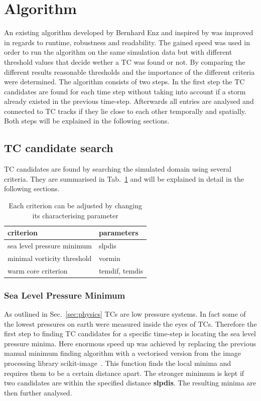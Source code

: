 \section{Algorithm}
An existing algorithm developed by Bernhard Enz and inspired by \cite{orig-tracking} was improved in regards to runtime, robustness and
readability. The gained speed was used in order to run the algorithm on the
same simulation data but with different threshold values that decide wether a
TC was found or not. By comparing the different results reasonable thresholds
and the importance of the different criteria were determined.\newline
The algorithm consists of two steps. In the first step the TC candidates are
found for each time step without taking into account if a storm already existed
in the previous time-step. Afterwards all entries are analysed and connected to
TC tracks if they lie close to each other temporally and spatially. Both steps
will be explained in the following sections.
\subsection{TC candidate search}
TC candidates are found by searching the simulated domain using several
criteria. They are summarised in Tab.~\ref{tab:search-algo-summ} and will be
explained in detail in the following sections.
\begin{table}[h]
	\centering
	\begin{tabular}{|l|l|}
		\hline
		\textbf{criterion}          & \textbf{parameters} \\ \hline
		sea level pressure minimum  & slpdis              \\
		minimal vorticity threshold & vormin              \\
		warm core criterion         & temdif, temdis      \\ \hline
	\end{tabular}
	\caption{Each criterion can be adjusted by changing its characterising
		parameter}
	\label{tab:search-algo-summ}
\end{table}

\subsubsection*{Sea Level Pressure Minimum}
As outlined in Sec.~\ref{sec:physics} TCs are low pressure systems. In fact
some of the lowest pressures on earth were measured inside the eyes of TCs.
Therefore the first step to finding TC candidates for a specific time-step is
locating the sea level pressure minima. Here enormous speed up was achieved by
replacing the previous manual minimum finding algorithm with a vectorised
version from the image processing library scikit-image~\cite{scikit-image}.
This function finds the local minima and requires them to be a certain distance
apart. The stronger minimum is kept if two candidates are within the specified
distance \textbf{slpdis}. The resulting minima are then further
analysed.
